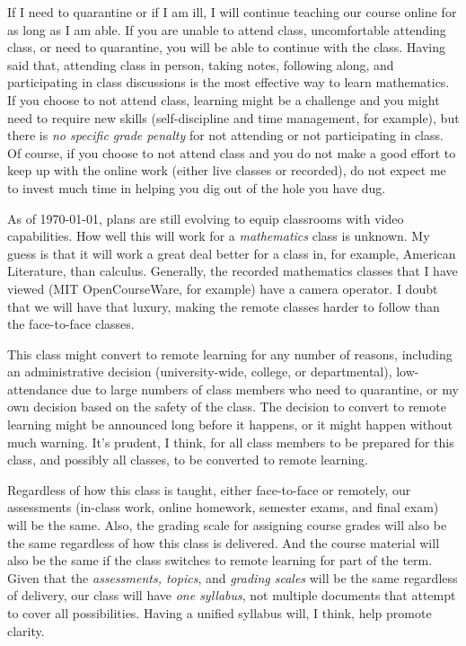 \documentclass[12pt]{article}
\newcounter{ex}\setcounter{ex}{0}
\begin{document}
If I need to quarantine or if I am ill,  I will continue teaching our course online for as long as I am able. If you are unable to attend class, uncomfortable attending class,  or need to quarantine, you will be able to continue with the class. Having said that,  attending class in person, taking notes, following along,  and participating  in class discussions is the most effective way to learn mathematics. If you choose to not attend class,  learning might be a challenge and you might need to  require new skills (self-discipline and time management, for example), but there is \emph{no specific grade penalty} for not attending or not participating in class. Of course, if you choose to not attend class and you  do not make a good effort to keep up with the online work (either live classes or recorded),  do not expect me to invest much time in helping you dig out of the hole you have dug.


As of \today, plans are still evolving to equip classrooms with video capabilities.  How well this will work for a \emph{mathematics} class is unknown.  My guess is that it will work a great deal better for a class in, for example, American Literature, than calculus.  Generally, the recorded mathematics classes that I have viewed (MIT OpenCourseWare, for example) have a camera operator. I doubt that we will have that luxury, making the remote classes harder to follow than the face-to-face classes.


This class might convert to remote learning for any number of reasons, including  an administrative decision (university-wide, college, or departmental), low-attendance due to  large numbers of class members who need to quarantine, or my own decision based on the safety of the class. The decision to convert to remote learning might be announced long before it happens, or it might happen without much warning. It's prudent, I think, for all class members to be prepared for this class, and possibly all classes, to be converted to remote learning.

Regardless of how this class is taught, either face-to-face or remotely, our assessments (in-class work, online homework, semester exams, and final exam) will be the same. Also, the grading scale for assigning course grades will also be the same regardless of how this class is delivered.  And the course material will also be the same if the class switches to remote learning for part of the term.  Given that the \emph{assessments, topics}, and \emph{grading scales} will be the same regardless of delivery, our class will have \emph{one syllabus}, not multiple documents that attempt to cover all possibilities. Having a unified syllabus will, I think, help promote clarity.
\end{document}
